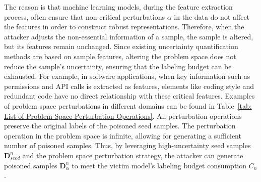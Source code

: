 \begin{table}[h!]
	\caption{Problem-Space Perturbation Operations}
	\label{tab: List of Problem Space Perturbation Operations}
	\setlength{\tabcolsep}{5.8pt}
	\begin{center}
	\end{center}
\end{table}

The reason is that machine learning models, during the feature extraction process, often ensure that non-critical perturbations $\alpha$ in the data do not affect the features in order to construct robust representations.
Therefore, when the attacker adjusts the non-essential information of a sample, the sample is altered, but its features remain unchanged.
Since existing uncertainty quantification methods are based on sample features, altering the problem space does not reduce the sample's uncertainty, ensuring that the labeling budget can be exhausted.
For example, in software applications, when key information such as permissions and API calls is extracted as features, elements like coding style and redundant code have no direct relationship with these critical features.
Examples of problem space perturbations in different domains can be found in Table~\ref{tab: List of Problem Space Perturbation Operations}.
All perturbation operations preserve the original labels of the poisoned seed samples.
The perturbation operation in the problem space is infinite, allowing for generating a sufficient number of poisoned samples.
Thus, by leveraging high-uncertainty seed samples $\bm{D}_{seed}^{n}$ and the problem space perturbation strategy, the attacker can generate poisoned samples $\bm{D}_{\alpha}^{n}$ to meet the victim model's labeling budget consumption $C_{n}$.


